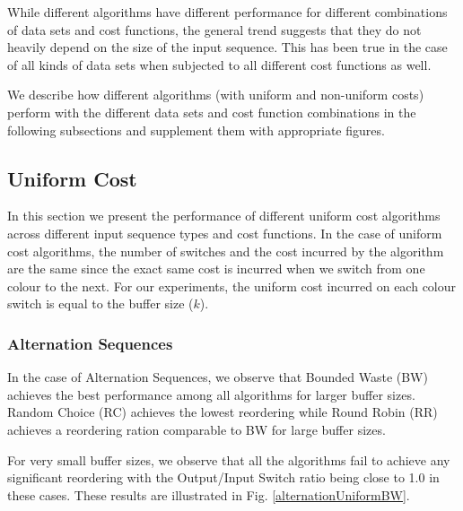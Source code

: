 While different algorithms have different performance for different combinations of data sets and cost functions, the general trend suggests that they do not heavily depend on the size of the input sequence. This has been true in the case of all kinds of data sets when subjected to all different cost functions as well. 

We describe how different algorithms (with uniform and non-uniform costs) perform with the different data sets and cost function combinations in the following subsections and supplement them with appropriate figures.


\subsection{Uniform Cost}

In this section we present the performance of different uniform cost algorithms across different input sequence types and cost functions.  In the case of uniform cost algorithms, the number of switches and the cost incurred by the algorithm are the same since the exact same cost is incurred when we switch from one colour to the next. For our experiments, the uniform cost incurred on each colour switch is equal to the buffer size ($k$).

\subsubsection{Alternation Sequences}

In the case of Alternation Sequences, we observe that Bounded Waste (BW) achieves the best performance among all algorithms for larger buffer sizes. Random Choice (RC) achieves the lowest reordering while Round Robin (RR) achieves a reordering ration comparable to BW for large buffer sizes. 

For very small buffer sizes, we observe that all the algorithms fail to achieve any significant reordering with the Output/Input Switch ratio being close to 1.0 in these cases. These results are illustrated in Fig. \ref{alternationUniformBW}.

